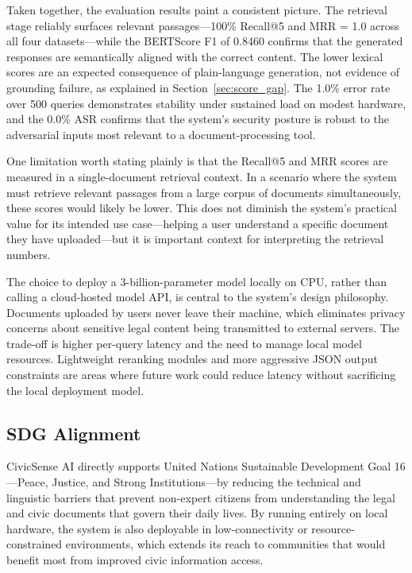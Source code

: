 \documentclass[conference]{IEEEtran}
\begin{document}
Taken together, the evaluation results paint a consistent picture. The retrieval stage reliably surfaces relevant passages---100\% Recall@5 and MRR = 1.0 across all four datasets---while the BERTScore F1 of 0.8460 confirms that the generated responses are semantically aligned with the correct content. The lower lexical scores are an expected consequence of plain-language generation, not evidence of grounding failure, as explained in Section~\ref{sec:score_gap}. The 1.0\% error rate over 500 queries demonstrates stability under sustained load on modest hardware, and the 0.0\% ASR confirms that the system's security posture is robust to the adversarial inputs most relevant to a document-processing tool.

One limitation worth stating plainly is that the Recall@5 and MRR scores are measured in a single-document retrieval context. In a scenario where the system must retrieve relevant passages from a large corpus of documents simultaneously, these scores would likely be lower. This does not diminish the system's practical value for its intended use case---helping a user understand a specific document they have uploaded---but it is important context for interpreting the retrieval numbers.

The choice to deploy a 3-billion-parameter model locally on CPU, rather than calling a cloud-hosted model API, is central to the system's design philosophy. Documents uploaded by users never leave their machine, which eliminates privacy concerns about sensitive legal content being transmitted to external servers. The trade-off is higher per-query latency and the need to manage local model resources. Lightweight reranking modules and more aggressive JSON output constraints are areas where future work could reduce latency without sacrificing the local deployment model.

\subsection{SDG Alignment}

CivicSense AI directly supports United Nations Sustainable Development Goal 16---Peace, Justice, and Strong Institutions---by reducing the technical and linguistic barriers that prevent non-expert citizens from understanding the legal and civic documents that govern their daily lives. By running entirely on local hardware, the system is also deployable in low-connectivity or resource-constrained environments, which extends its reach to communities that would benefit most from improved civic information access.
\end{document}
